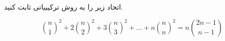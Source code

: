 \EXERCISE
اتحاد زیر را به روش ترکیبیاتی ثابت کنید.

$$\binom{n}{1}^2 + 2\binom{n}{2}^2 + 3\binom{n}{3}^2 + ... + n\binom{n}{n}^2 = n\binom{2n-1}{n-1}$$